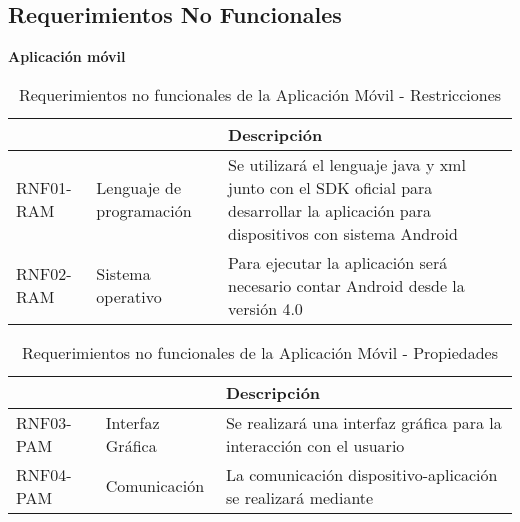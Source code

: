 \subsection{Requerimientos No Funcionales} 
  
\textbf{Aplicación móvil}
\begin{center}
\begin{table}[!htb]
\centering
\begin{tabular}{|p{4cm}|p{4cm}|p{5cm}|}
    \hline
    \centering {\bfseries }  & \centering {\bfseries Nombre} & {\bfseries Descripción} \\ \hline
    \centering RNF01-RAM & \centering Lenguaje de programación & Se utilizará el lenguaje java y xml junto con el SDK oficial para desarrollar la aplicación para dispositivos con sistema Android \\ \hline
    \centering RNF02-RAM & \centering Sistema operativo & Para ejecutar la aplicación será necesario contar Android desde la versión 4.0\\ \hline
\end{tabular}
\caption{Requerimientos no funcionales de la Aplicación Móvil - Restricciones}
\label{tab:rnfr_am}
\end{table}
\end{center}
    

\begin{center}
\begin{table}[!htb]
\centering
\begin{tabular}{|p{4cm}|p{4cm}|p{5cm}|}
    \hline
    \centering {\bfseries }  & \centering {\bfseries Nombre} & {\bfseries Descripción} \\ \hline
    \centering RNF03-PAM & \centering Interfaz Gráfica & Se realizará una interfaz gráfica para la interacción con el usuario \\ \hline 
    \centering RNF04-PAM &  \centering Comunicación & La comunicación dispositivo-aplicación se realizará mediante \\
    \hline
\end{tabular}
\caption{Requerimientos no funcionales de la Aplicación Móvil - Propiedades}
\label{tab:rnfp_am}
\end{table}
\end{center}

